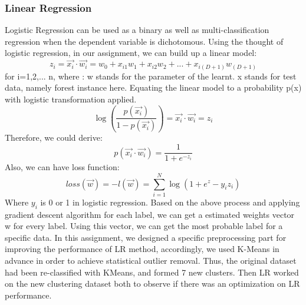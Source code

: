\documentclass[12pt]{report}
\begin{document}
\subsubsection*{Linear Regression}
Logistic Regression can be used as a binary as well as multi-classification regression when the dependent variable is dichotomous. Using the thought of logistic regression, in our assignment, we can build up a linear model:
\newline $$z_i=\vec{x_i} \cdot \vec{w_i} = w_0 + x_{i1}w_1+x_{i2}w_2+...+x_{i(D+1)}w_{(D+1)}$$
\newline for i=1,2,... n, where :
\newline w stands for the parameter of the learnt.
\newline x stands for test data, namely forest instance here. 
\newline 
Equating the linear model to a probability p(x) with logistic transformation applied. 
\newline $$\log(\frac{p(\vec{x_i})}{1-p(\vec{x_i})}) = \vec{x_i} \cdot \vec{w_i} = z_i$$
\newline Therefore, we could derive: 
\newline $$p(\vec{x_i} \cdot \vec{w_i}) = \frac{1}{1+e^{-z_{i}}}$$
\newline Also, we can have loss function:
\newline $$loss(\vec{w}) = -l(\vec{w}) = \sum_{i=1}^{N}\log(1+e^z-y_iz_i)$$
Where $y_i$ is 0 or 1 in logistic regression.
\newline
Based on the above process and applying gradient descent algorithm for each label, we can get a estimated weights vector w for every label. Using this vector, we can get the most probable label for a specific data. 
\newline
\newline
In this assignment, we designed a specific preprocessing part for improving the performance of LR method, accordingly, we used K-Means in advance in order to achieve statistical outlier removal. Thus, the original dataset had been re-classified with KMeans, and formed 7 new clusters. Then LR worked on the new clustering dataset both to observe if there was an optimization on LR performance.
\end{document}
